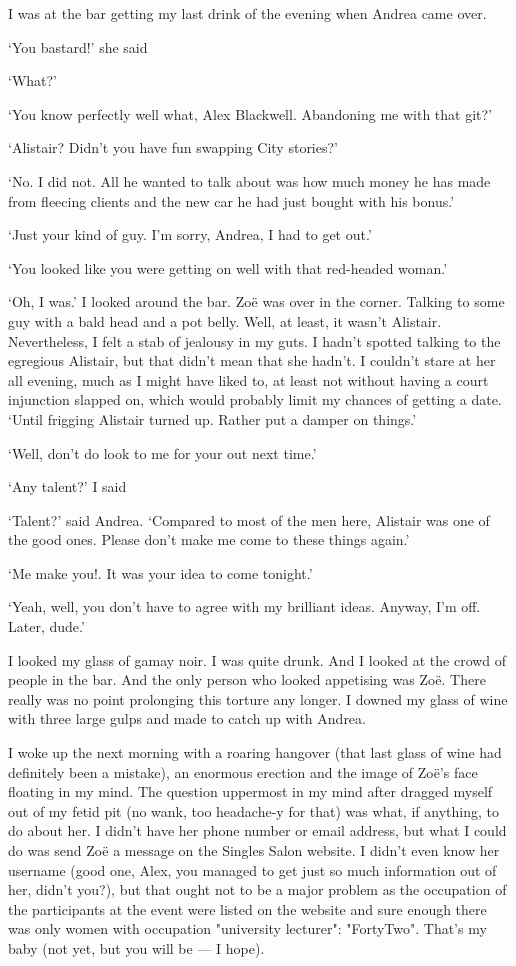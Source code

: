 I was at the bar getting my last drink of the evening when Andrea
came over.

`You bastard!' she said

`What?'

`You know perfectly well what, Alex Blackwell. Abandoning me with
that git?'

`Alistair? Didn't you have fun swapping City stories?'

`No. I did not. All he wanted to talk about was how much money he
has made from fleecing clients and the new car he had just bought
with his bonus.'

`Just your kind of guy. I'm sorry, Andrea, I had to get out.'

`You looked like you were getting on well with that red-headed
woman.'

`Oh, I was.' I looked around the bar. Zoë was over in the
corner. Talking to some guy with a bald head and a pot belly. Well,
at least, it wasn't Alistair. Nevertheless, I felt a stab of
jealousy in my guts. I hadn't spotted talking to the egregious
Alistair, but that didn't mean that she hadn't. I couldn't stare at
her all evening, much as I might have liked to, at least not without
having a court injunction slapped on, which would probably limit my
chances of getting a date. `Until frigging Alistair turned up.
Rather put a damper on things.'

`Well, don't do look to me for your out next time.'

`Any talent?' I said

`Talent?' said Andrea. `Compared to most of the men here, Alistair
was one of the good ones. Please don't make me come to these things
again.'

`Me make {\twelveit you!}. It was your idea to come tonight.'

`Yeah, well, you don't have to agree with my brilliant ideas.
Anyway, I'm off. Later, dude.'

I looked my glass of gamay noir. I was quite drunk. And I looked at
the crowd of people in the bar. And the only person who looked
appetising was Zoë. There really was no point prolonging this
torture any longer. I downed my glass of wine with three large gulps
and made to catch up with Andrea.

I woke up the next morning with a roaring hangover (that last glass
of wine had definitely been a mistake), an enormous erection and the
image of Zoë's face floating in my mind. The question uppermost
in my mind after dragged myself out of my fetid pit (no wank, too
headache-y for {\twelveit that}) was what, if anything, to do about
her. I didn't have her phone number or email address, but what I
could do was send Zoë a message on the Singles Salon website. I
didn't even know her username (good one, Alex, you managed to get
just so much information out of her, didn't you?), but that ought
not to be a major problem as the occupation of the participants at
the event were listed on the website and sure enough there was only
women with occupation "university lecturer": "FortyTwo". That's my
baby (not yet, but you will be --- I hope).

